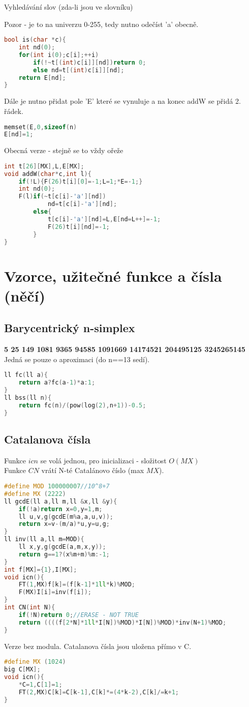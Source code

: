 \documentclass[11pt]{article}
\begin{document}
\begin{center}
Vyhledávání slov (zda-li jsou ve slovníku)
\end{center}
Pozor - je to na univerzu 0-255, tedy nutno odečíst 'a' obecně.
\begin{lstlisting}[language=C++]
bool is(char *c){
    int nd(0);
    for(int i(0);c[i];++i)
        if(!~t[(int)c[i]][nd])return 0;
        else nd=t[(int)c[i]][nd];
    return E[nd];
}
\end{lstlisting}
Dále je nutno přidat pole 'E' které se vynuluje a na konec addW se přidá 2. řádek.
\begin{lstlisting}[language=C++]
memset(E,0,sizeof(n)
E[nd]=1;
\end{lstlisting}
Obecná verze - stejně se to vždy ořeže
\begin{lstlisting}[language=C++]
int t[26][MX],L,E[MX];
void addW(char*c,int l){
	if(!L){F(26)t[i][0]=-1;L=1;*E=-1;}
    int nd(0);
    F(l)if(~t[c[i]-'a'][nd])
            nd=t[c[i]-'a'][nd];
        else{
            t[c[i]-'a'][nd]=L,E[nd=L++]=-1;
            F(26)t[i][nd]=-1;
        }
}
\end{lstlisting}
\newpage\section{Vzorce, užitečné funkce a čísla (něčí)}
\subsection{Barycentrický n-simplex}
\textbf{5 25 149 1081 9365 94585 1091669 14174521 204495125 3245265145}
\\Jedná se pouze o aproximaci (do n==13 sedí).
\begin{lstlisting}[language=C++]
ll fc(ll a){
    return a?fc(a-1)*a:1;
}
ll bss(ll n){
    return fc(n)/(pow(log(2),n+1))-0.5;
}
\end{lstlisting}
\subsection{Catalanova čísla}
Funkce $icn$ se volá jednou, pro inicializaci - složitost $O(MX)$
\\Funkce $CN$ vrátí \textsf{N}-té Catalánovo číslo (max $MX$).
\begin{lstlisting}[language=C++]
#define MOD 100000007//10^8+7
#define MX (2222)
ll gcdE(ll a,ll m,ll &x,ll &y){
    if(!a)return x=0,y=1,m;
    ll u,v,g(gcdE(m%a,a,u,v));
    return x=v-(m/a)*u,y=u,g;
}
ll inv(ll a,ll m=MOD){
    ll x,y,g(gcdE(a,m,x,y));
    return g==1?(x%m+m)%m:-1;
}
int f[MX]={1},I[MX];
void icn(){
    FT(1,MX)f[k]=(f[k-1]*1ll*k)%MOD;
    F(MX)I[i]=inv(f[i]);
}
int CN(int N){
    if(!N)return 0;//ERASE - NOT TRUE
    return ((((f[2*N]*1ll*I[N])%MOD)*I[N])%MOD)*inv(N+1)%MOD;
}
\end{lstlisting}
Verze bez modula. Catalanova čísla jsou uložena přímo v \textsf{C}.
\begin{lstlisting}[language=C++]
#define MX (1024)
big C[MX];
void icn(){
    *C=1,C[1]=1;
    FT(2,MX)C[k]=C[k-1],C[k]*=(4*k-2),C[k]/=k+1;
}
\end{lstlisting}
\end{document}
